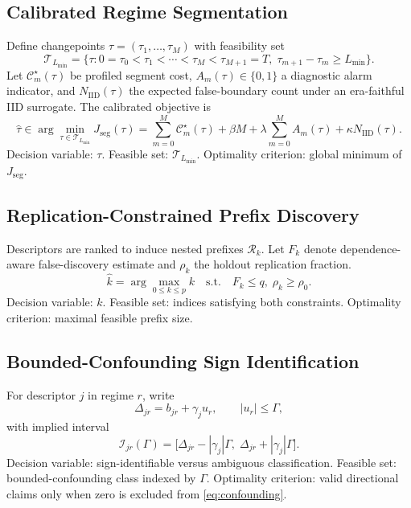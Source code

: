 \documentclass{article} %
\begin{document}
\subsection{Calibrated Regime Segmentation}
Define changepoints $\tau=(\tau_1,\ldots,\tau_M)$ with feasibility set
\[
\mathcal{T}_{L_{\min}}=\{\tau:0=\tau_0<\tau_1<\cdots<\tau_M<\tau_{M+1}=T,\;\tau_{m+1}-\tau_m\ge L_{\min}\}.
\]
Let $\mathcal{C}^{\star}_m(\tau)$ be profiled segment cost, $A_m(\tau)\in\{0,1\}$ a diagnostic alarm indicator, and $N_{\mathrm{IID}}(\tau)$ the expected false-boundary count under an era-faithful IID surrogate. The calibrated objective is
\begin{equation}
\hat{\tau}\in\arg\min_{\tau\in\mathcal{T}_{L_{\min}}}
J_{\mathrm{seg}}(\tau)
=\sum_{m=0}^{M}\mathcal{C}^{\star}_m(\tau)+\beta M+\lambda\sum_{m=0}^{M}A_m(\tau)+\kappa N_{\mathrm{IID}}(\tau).
\label{eq:segmentation}
\end{equation}
Decision variable: $\tau$. Feasible set: $\mathcal{T}_{L_{\min}}$. Optimality criterion: global minimum of $J_{\mathrm{seg}}$.

\subsection{Replication-Constrained Prefix Discovery}
Descriptors are ranked to induce nested prefixes $\mathcal{R}_k$. Let $F_k$ denote dependence-aware false-discovery estimate and $\rho_k$ the holdout replication fraction.
\begin{equation}
\hat{k}=\arg\max_{0\le k\le p}k
\quad\text{s.t.}\quad F_k\le q,\;\rho_k\ge\rho_0.
\label{eq:prefix}
\end{equation}
Decision variable: $k$. Feasible set: indices satisfying both constraints. Optimality criterion: maximal feasible prefix size.

\subsection{Bounded-Confounding Sign Identification}
For descriptor $j$ in regime $r$, write
\begin{equation}
\Delta_{jr}=b_{jr}+\gamma_j u_r,\qquad |u_r|\le\Gamma,
\label{eq:confounding-model}
\end{equation}
with implied interval
\begin{equation}
\mathcal{I}_{jr}(\Gamma)=\big[\Delta_{jr}-|\gamma_j|\Gamma,\;\Delta_{jr}+|\gamma_j|\Gamma\big].
\label{eq:confounding}
\end{equation}
Decision variable: sign-identifiable versus ambiguous classification. Feasible set: bounded-confounding class indexed by $\Gamma$. Optimality criterion: valid directional claims only when zero is excluded from \eqref{eq:confounding}.
\end{document}
